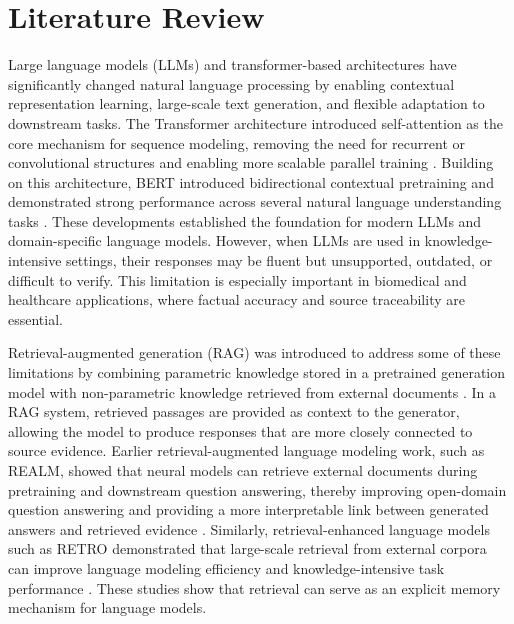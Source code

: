 \section{Literature Review}

Large language models (LLMs) and transformer-based architectures have significantly changed natural language processing by enabling contextual representation learning, large-scale text generation, and flexible adaptation to downstream tasks. The Transformer architecture introduced self-attention as the core mechanism for sequence modeling, removing the need for recurrent or convolutional structures and enabling more scalable parallel training \cite{vaswani2017attention}. Building on this architecture, BERT introduced bidirectional contextual pretraining and demonstrated strong performance across several natural language understanding tasks \cite{devlin2019bert}. These developments established the foundation for modern LLMs and domain-specific language models. However, when LLMs are used in knowledge-intensive settings, their responses may be fluent but unsupported, outdated, or difficult to verify. This limitation is especially important in biomedical and healthcare applications, where factual accuracy and source traceability are essential.

Retrieval-augmented generation (RAG) was introduced to address some of these limitations by combining parametric knowledge stored in a pretrained generation model with non-parametric knowledge retrieved from external documents \cite{lewis2020rag}. In a RAG system, retrieved passages are provided as context to the generator, allowing the model to produce responses that are more closely connected to source evidence. Earlier retrieval-augmented language modeling work, such as REALM, showed that neural models can retrieve external documents during pretraining and downstream question answering, thereby improving open-domain question answering and providing a more interpretable link between generated answers and retrieved evidence \cite{guu2020realm}. Similarly, retrieval-enhanced language models such as RETRO demonstrated that large-scale retrieval from external corpora can improve language modeling efficiency and knowledge-intensive task performance \cite{borgeaud2022retro}. These studies show that retrieval can serve as an explicit memory mechanism for language models.

